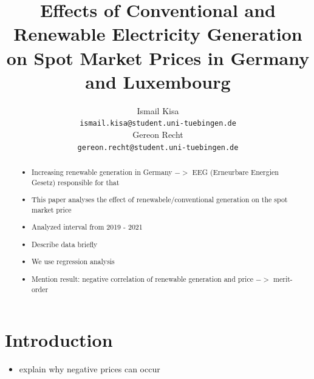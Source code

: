 \documentclass{article}
\title{Effects of Conventional and Renewable Electricity Generation on Spot Market Prices in Germany and Luxembourg}
\author{%
Ismail Kisa\\
\texttt{ismail.kisa@student.uni-tuebingen.de}\\
\And Gereon Recht\\
\texttt{gereon.recht@student.uni-tuebingen.de} \\
}
\begin{document}
\maketitle

\begin{abstract}
\begin{itemize}
    \item Increasing renewable generation in Germany $->$ EEG (Erneurbare Energien Gesetz) responsible for that
    \item This paper analyses the effect of renewabele/conventional generation on the spot market price
    \item Analyzed interval from 2019 - 2021
    \item Describe data briefly
    \item We use regression analysis
    \item Mention result: negative correlation of renewable generation and price $->$ merit-order
\end{itemize}


\end{abstract}

\section{Introduction}

\begin{itemize}
    \item explain why negative prices can occur
\end{itemize}
\end{document}
